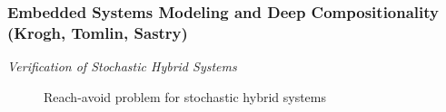\subsubsection{Embedded Systems Modeling and Deep Compositionality (Krogh, Tomlin, Sastry)}
                 
                 \emph{Verification of Stochastic Hybrid Systems}

                 \begin{figure}[!t]
                   \begin{center}
                     \begin{subfigmatrix}{2}%
                     \end{subfigmatrix}   
                     \caption{Reach-avoid problem for stochastic hybrid systems}
                     \label{fig:reach_avoid_problem}
                   \end{center}
                 \end{figure}

